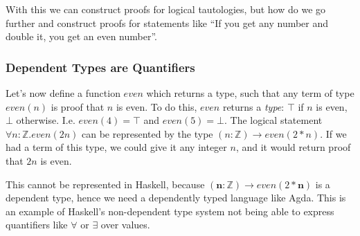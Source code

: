 \documentclass[12pt,twoside]{report}
\begin{document}
With this we can construct proofs for logical tautologies, but how do we go further and construct proofs for statements like ``If you get any number and double it, you get an even number''.

\subsubsection{Dependent Types are Quantifiers}
Let's now define a function $even$ which returns a type, such that any term of type $even(n)$ is proof that $n$ is even. To do this, $even$ returns a \textit{type}: $\top$ if $n$ is even, $\bot$ otherwise. I.e. $even(4) = \top$ and $even(5) = \bot$. The logical statement $\forall n : \mathbb{Z}. even(2n)$ can be represented by the type $(n: \mathbb{Z}) \rightarrow even(2 * n)$. If we had a term of this type, we could give it any integer $n$, and it would return proof that $2n$ is even.

This cannot be represented in Haskell, because $(\textbf{n}: \mathbb{Z}) \rightarrow even(2 * \textbf{n})$ is a dependent type, hence we need a dependently typed language like Agda. This is an example of Haskell's non-dependent type system not being able to express quantifiers like $\forall$ or $\exists$ over values.


\end{document}
